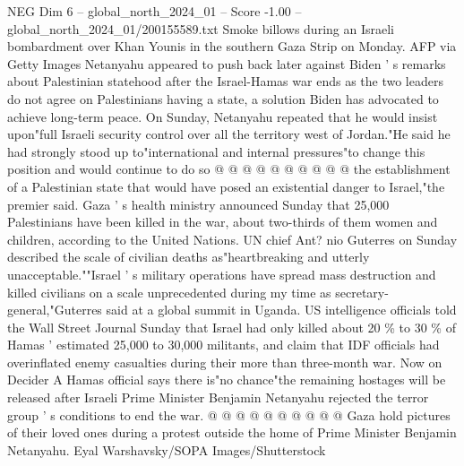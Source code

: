 \begin{textsample}{NEG Dim 6 – global\_north\_2024\_01 – Score -1.00 – global\_north\_2024\_01/200155589.txt}
Smoke billows during an Israeli bombardment over Khan Younis in the southern Gaza Strip on Monday.
AFP via Getty Images Netanyahu appeared to push back later against Biden ' s remarks about Palestinian statehood after the Israel-Hamas war ends as the two leaders do not agree on Palestinians having a state, a solution Biden has advocated to achieve long-term peace.
On Sunday, Netanyahu repeated that he would insist upon"full Israeli security control over all the territory west of Jordan."He said he had strongly stood up to"international and internal pressures"to change this position and would continue to do so @ @ @ @ @ @ @ @ @ @ the establishment of a Palestinian state that would have posed an existential danger to Israel,"the premier said.
Gaza ' s health ministry announced Sunday that 25,000 Palestinians have been killed in the war, about two-thirds of them women and children, according to the United Nations.
UN chief Ant? nio Guterres on Sunday described the scale of civilian deaths as"heartbreaking and utterly unacceptable.""Israel ' s military operations have spread mass destruction and killed civilians on a scale unprecedented during my time as secretary-general,"Guterres said at a global summit in Uganda.
US intelligence officials told the Wall Street Journal Sunday that Israel had only killed about 20 \% to 30 \% of Hamas ' estimated 25,000 to 30,000 militants, and claim that IDF officials had overinflated enemy casualties during their more than three-month war.
Now on Decider A Hamas official says there is"no chance"the remaining hostages will be released after Israeli Prime Minister Benjamin Netanyahu rejected the terror group ' s conditions to end the war. @ @ @ @ @ @ @ @ @ @ Gaza hold pictures of their loved ones during a protest outside the home of Prime Minister Benjamin Netanyahu.
Eyal Warshavsky/SOPA Images/Shutterstock

\end{textsample}
